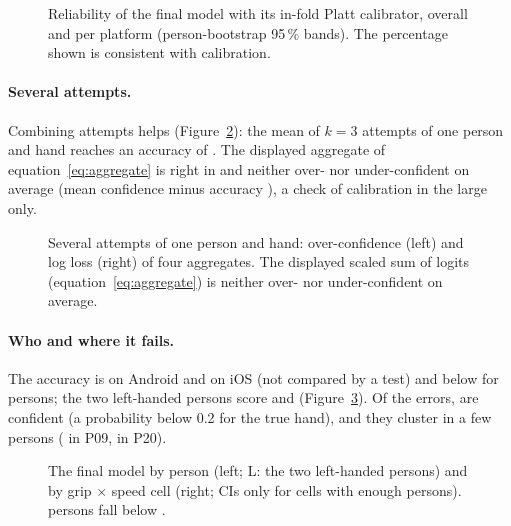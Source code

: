 \begin{figure}[htbp]
\centering
{}
\caption{Reliability of the final model with its in-fold Platt calibrator, overall and per platform
(person-bootstrap 95\,\% bands). The percentage shown is consistent with calibration.}
\label{fig:FINAL_08_calibration}
\end{figure}

\paragraph{Several attempts.} Combining attempts helps (Figure~\ref{fig:FINAL_10_attempts}): the mean \pright{} of
$k = 3$ attempts of one person and hand reaches an accuracy of . The displayed aggregate of
equation~\eqref{eq:aggregate} is right in  and neither over- nor under-confident on
average (mean confidence minus accuracy ), a check of calibration in the large only.

\begin{figure}[htbp]
\centering
{}
\caption{Several attempts of one person and hand: over-confidence (left) and log loss (right) of four aggregates.
The displayed scaled sum of logits (equation~\ref{eq:aggregate}) is neither over- nor under-confident on average.}
\label{fig:FINAL_10_attempts}
\end{figure}

\paragraph{Who and where it fails.} The accuracy is  on Android and 
on iOS (not compared by a test) and below  for  persons; the two
left-handed persons score  and  (Figure~\ref{fig:FINAL_11_persons}). Of
the  errors,  are confident (a probability below 0.2 for the true hand), and
they cluster in a few persons ( in P09,  in P20).

\begin{figure}[htbp]
\centering
{}
\caption{The final model by person (left; L: the two left-handed persons) and by grip $\times$ speed cell (right;
CIs only for cells with enough persons).  persons fall below .}
\label{fig:FINAL_11_persons}
\end{figure}

